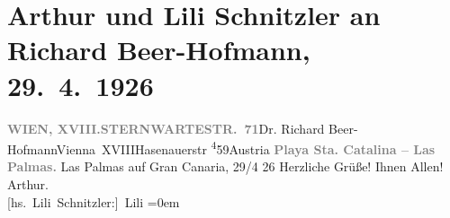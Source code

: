 

         
         \renewcommand{\erwaehntePersonen}{Personen: Richard Beer-Hofmann}
         \renewcommand{\erwaehnteOrte}{Orte: Hasenauerstraße, Las Palmas de Gran Canaria, Playa Santa Catalinas, Sternwartestraße, Wien, XVIII., Währing, Österreich}
         \renewcommand{\erwaehnteWerke}{}
               \section[Arthur und Lili Schnitzler an Richard Beer-Hofmann, 29. 4. 1926]{ Arthur und Lili Schnitzler an Richard Beer-Hofmann, 29. 4. 1926}\nopagebreak{}\rehead{ }\begin{ledgroupsized}[t]{13cm}\normalsize\beginnumbering \toendnotes[C]{\smallbreak\pagebreak[2]} 
\toendnotes[C]{\smallbreak}\pstart{}{\pb}\label{T_L02471-1v}\label{T_L02471-1h}\pend{}\pstart{}\textcolor{gray}{\textbf{WIEN, XVIII.}}\pend{}\pstart{}\textcolor{gray}{\textbf{STERNWARTESTR. 71}}\pend{}{\bigskip}\pstart{}Dr. Richard Beer-Hofmann\pend{}\pstart{}Vienna XVIII\pend{}\pstart{}Hasenauerstr \substVorne{}\textsuperscript{4}\substDazwischen{}5\substHinten{}9\pend{}\pstart{}Austria\pend{}{\bigskip}\pstart
           \noindent{}\centering{}{\pb}\textcolor{gray}{\textbf{Playa Sta. Catalina – Las Palmas.}}\pend
           \pstart
           \raggedleft{}{\pb}Las Palmas auf Gran Canaria, 29/4
                     26\pend
           \pstart
           Herzliche Grüße! Ihnen Allen!\pend
           \pstart
           \spacefill\mbox{Arthur.}{\\[\baselineskip]}\spacefill\mbox{{[}hs. Lili Schnitzler:{]} Lili}\pend
           \leftskip=0em{}
         
         \endnumbering{}\end{ledgroupsized}  \newcommand{\dateiname}{L02471}\newcommand{\titel}{Arthur und Lili Schnitzler an Richard Beer-Hofmann, 29. 4. 1926}\newcommand{\editorInnen}{Martin Anton Müller und Gerd-Hermann Susen}
      